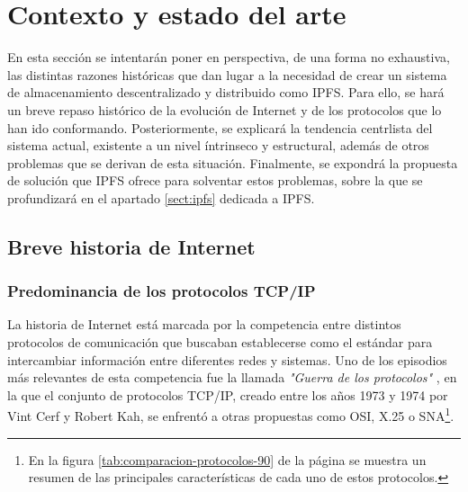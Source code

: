 \chapter{Contexto y estado del arte}

En esta sección se intentarán poner en perspectiva, de una forma no exhaustiva, las distintas razones
históricas que dan lugar a la necesidad de crear un sistema de almacenamiento descentralizado y distribuido como IPFS.
Para ello, se hará un breve repaso histórico de la evolución de Internet y de los protocolos que lo han ido conformando.
Posteriormente, se explicará la tendencia centrlista del sistema actual, existente a un nivel íntrinseco y estructural,
además de otros problemas que se derivan de esta situación.
Finalmente, se expondrá la propuesta de solución que IPFS ofrece para solventar estos problemas, sobre la que se profundizará en el apartado \ref{sect:ipfs} dedicada a IPFS.

\section{Breve historia de Internet}
\subsection{Predominancia de los protocolos TCP/IP}
La historia de Internet está marcada por la competencia entre distintos protocolos de comunicación que buscaban establecerse
como el estándar para intercambiar información entre diferentes redes y sistemas. Uno de los episodios más relevantes de esta
competencia fue la llamada \textit{"Guerra de los protocolos"} \cite{ProtocolWars2023}, en la que el conjunto de protocolos TCP/IP, creado entre los
años 1973 y 1974 por Vint Cerf y Robert Kah, se enfrentó a otras propuestas como OSI, X.25 o SNA\footnote{En la figura \ref{tab:comparacion-protocolos-90} de la página \pageref{tab:comparacion-protocolos-90} se muestra un resumen de las principales características de cada uno de estos protocolos.
}.


